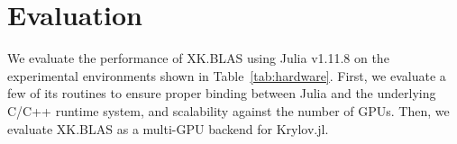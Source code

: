 \documentclass{juliacon}
\newcommand{\todo}[1]{\textcolor{red}{\textbf{TODO:} #1}}
\begin{document}





\section{Evaluation} \label{sec:eval}


We evaluate the performance of XK.BLAS using Julia v1.11.8 on the experimental environments shown in Table~\ref {tab:hardware}.
First, we evaluate a few of its routines to ensure proper binding between Julia and the underlying C/C++ runtime system, and scalability against the number of GPUs.
Then, we evaluate XK.BLAS as a multi-GPU backend for Krylov.jl.
\end{document}
